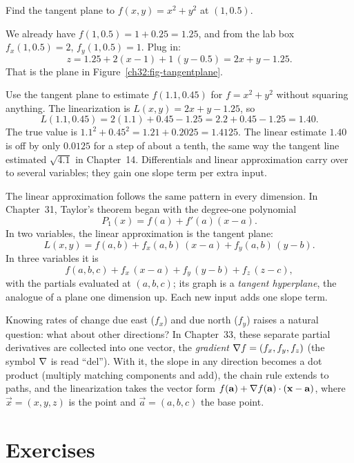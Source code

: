 \begin{example}
\label{ch32:ex-tangent}
Find the tangent plane to $f(x,y)=x^2+y^2$ at $(1,0.5)$.

We already have $f(1,0.5)=1+0.25=1.25$, and from the lab box $f_x(1,0.5)=2$,
$f_y(1,0.5)=1$. Plug in:
\[
   z = 1.25 + 2(x-1) + 1\,(y-0.5) = 2x + y - 1.25 .
\]
That is the plane in Figure~\ref{ch32:fig-tangentplane}.
\end{example}

\begin{example}
\label{ch32:ex-linapprox}
Use the tangent plane to estimate $f(1.1, 0.45)$ for $f=x^2+y^2$ without squaring anything.
The linearization is $L(x,y)=2x+y-1.25$, so
\[
   L(1.1,0.45) = 2(1.1) + 0.45 - 1.25 = 2.2 + 0.45 - 1.25 = 1.40 .
\]
The true value is $1.1^2 + 0.45^2 = 1.21 + 0.2025 = 1.4125$. The linear estimate $1.40$ is off
by only $0.0125$ for a step of about a tenth, the same way the tangent line estimated
$\sqrt{4.1}$ in Chapter~14. Differentials and linear approximation carry over to several
variables; they gain one slope term per extra input.
\end{example}

\begin{aestheticbox}
The linear approximation follows the same pattern in every dimension. In Chapter~31, Taylor's
theorem began with the degree-one polynomial
\[
   P_1(x) = f(a)+f'(a)(x-a).
\]
In two variables, the linear approximation is the tangent plane:
\[
   L(x,y) = f(a,b)+f_x(a,b)\,(x-a)+f_y(a,b)\,(y-b).
\]
In three variables it is
\[
   f(a,b,c)+f_x\,(x-a)+f_y\,(y-b)+f_z\,(z-c),
\]
with the partials evaluated at $(a,b,c)$; its graph is a \emph{tangent hyperplane}, the
analogue of a plane one dimension up. Each new input adds one slope term.

Knowing rates of change due east ($f_x$) and due north ($f_y$) raises a natural question:
what about other directions? In Chapter~33, these separate partial derivatives are collected
into one vector, the \emph{gradient} $\nabla f = (f_x, f_y, f_z)$ (the symbol $\nabla$ is read
``del''). With it, the slope in any direction becomes a dot product (multiply matching
components and add), the chain rule extends to paths, and the linearization takes the vector
form $f(\mathbf{a}) + \nabla f(\mathbf{a})\cdot(\mathbf{x} - \mathbf{a})$, where $\vec x=(x,y,z)$ is the point
and $\vec a=(a,b,c)$ the base point.
\end{aestheticbox}

\section{Exercises}
\label{ch32:sec-exercises}

